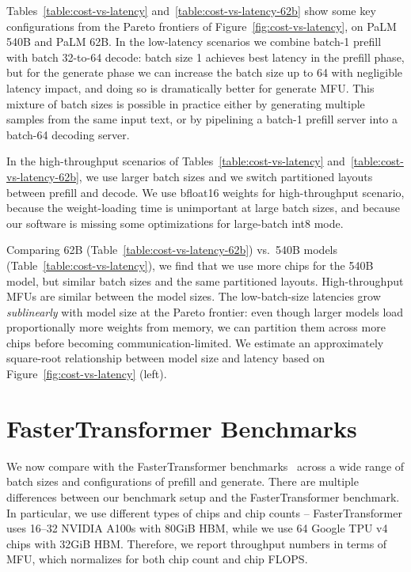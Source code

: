 Tables~\ref{table:cost-vs-latency} and~\ref{table:cost-vs-latency-62b} show some key configurations from the Pareto frontiers of Figure~\ref{fig:cost-vs-latency}, on PaLM 540B and PaLM 62B. In the low-latency scenarios we combine batch-1 prefill with batch 32-to-64 decode: batch size 1 achieves best latency in the prefill phase, but for the generate phase we can increase the batch size up to 64 with negligible latency impact, and doing so is dramatically better for generate MFU. This mixture of batch sizes is possible in practice either by generating multiple samples from the same input text, or by pipelining a batch-1 prefill server into a batch-64 decoding server. 

In the high-throughput scenarios of Tables~\ref{table:cost-vs-latency} and~\ref{table:cost-vs-latency-62b}, we use larger batch sizes and we switch partitioned layouts between prefill and decode. We use bfloat16 weights for high-throughput scenario, because the weight-loading time is unimportant at large batch sizes, and because our software is missing some optimizations for large-batch int8 mode. 

Comparing 62B (Table~\ref{table:cost-vs-latency-62b}) vs.\ 540B models (Table~\ref{table:cost-vs-latency}), we find that we use more chips for the 540B model, but similar batch sizes and the same partitioned layouts. High-throughput MFUs are similar between the model sizes. The low-batch-size latencies grow \emph{sublinearly} with model size at the Pareto frontier: even though larger models load proportionally more weights from memory, we can partition them across more chips before becoming communication-limited. We estimate an approximately square-root relationship between model size and latency based on Figure~\ref{fig:cost-vs-latency} (left). 

\section{FasterTransformer Benchmarks}\label{sec:faster-transformer}
We now compare with the FasterTransformer benchmarks~\cite{fastertransformer} across a wide range of batch sizes and configurations of prefill and generate. There are multiple differences between our benchmark setup and the FasterTransformer benchmark. In particular, we use different types of chips and chip counts -- FasterTransformer uses 16--32 NVIDIA A100s with 80GiB HBM, while we use 64 Google TPU v4 chips with 32GiB HBM. Therefore, we report throughput numbers in terms of MFU, which normalizes for both chip count and chip FLOPS. 

